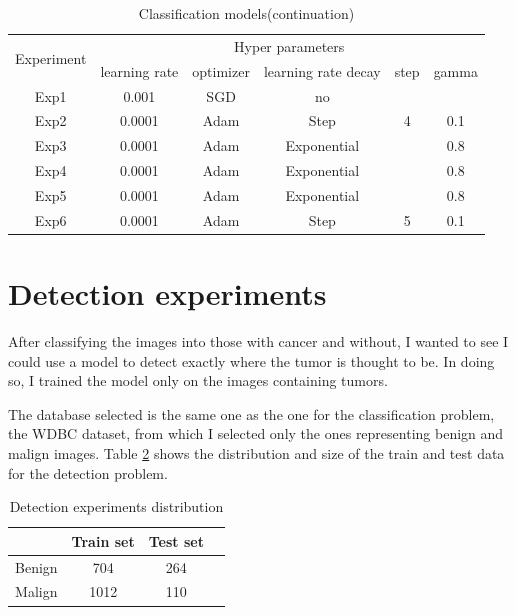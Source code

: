 \begin{table}[H]
    \centering
    \begin{tabular}{|c|c|c|c|c|c|}
        \hline
        \multirow{2}{5em}{Experiment}  & \multicolumn{5}{c|}{Hyper parameters} \\ \cline{2-6}
         & learning rate & optimizer & learning rate decay & step & gamma \\
        \hline \hline
        Exp1 & 0.001 & SGD & no &  &   \\
        \hline
        Exp2 & 0.0001 & Adam & Step & 4 & 0.1 \\
        \hline
        Exp3 & 0.0001 & Adam & Exponential & & 0.8\\
        \hline
        Exp4 & 0.0001 & Adam & Exponential & & 0.8\\
        \hline
        Exp5 & 0.0001 & Adam & Exponential & & 0.8\\
        \hline 
        Exp6 & 0.0001 & Adam & Step & 5 & 0.1\\
        \hline
    \end{tabular}
    \caption{Classification models(continuation)}
    \label{tab:tab5}
\end{table}

\section{Detection experiments}

After classifying the images into those with cancer and without, I wanted to see I could use a model to detect exactly where the tumor is thought to be. In doing so, I trained the model only on the images containing tumors.

The database selected is the same one as the one for the classification problem, the WDBC dataset, from which I selected only the ones representing benign and malign images. Table \ref{tab:tab6} shows the distribution and size of the train and test data for the detection problem.

\begin{table}[ht!]
\centering
\begin{tabular}{|c|c|c|c|}
    \hline
     & Train set & Test set \\ \hline
    Benign & 704 & 264 \\ \hline
    Malign & 1012 & 110\\ \hline
    \end{tabular}
    \caption{Detection experiments distribution}
    \label{tab:tab6}
\end{table}

